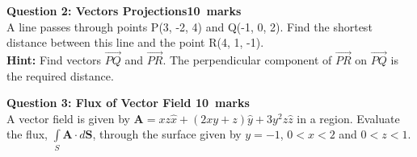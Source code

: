 \documentclass[12pt,a4paper]{article}
\def\Qtwo{10}
\def\Qthree{10}
\begin{document}
\noindent \textbf{Question 2: Vectors Projections\hfill \Qtwo~marks}\\
A line passes through points P(3, -2, 4) and Q(-1, 0, 2). Find the shortest distance between this line and the point R(4, 1, -1).\\
\noindent \textbf{Hint:} Find vectors $\overrightarrow{PQ}$ and $\overrightarrow{PR}$. The perpendicular component of $\overrightarrow{PR}$ on $\overrightarrow{PQ}$ is the required distance.
\begin{figure}[H]
\end{figure}
\noindent\textbf{Question 3: Flux of Vector Field \hfill \Qthree~marks}\\
A vector field is given by $\textbf{A}=xz\hat x+(2xy+z)\hat y+3y^2z\hat z$ in a region. Evaluate the flux, $\int\limits_{S}\textbf{A}\cdot d\textbf{S}$, through the surface given by $y=-1$, $0<x<2$ and $0<z<1$.
\begin{figure}[H]
\end{figure}
\end{document}
